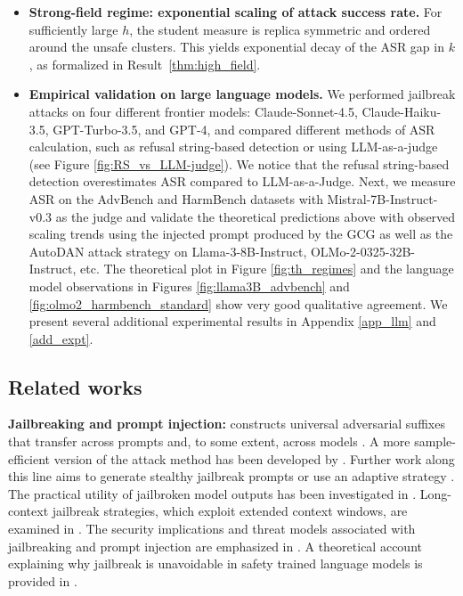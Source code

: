 \documentclass{article}
\theoremstyle{remark} %
\begin{document}
\begin{itemize}
\item \textbf{Strong-field regime: exponential scaling of attack success rate.}
For sufficiently large $h$, the student measure is replica symmetric and ordered around the unsafe clusters. This yields exponential decay of the ASR gap in $k$, as formalized in Result~\ref{thm:high_field}.

\item \textbf{Empirical validation on large language models.} We performed jailbreak attacks on four different frontier models: Claude-Sonnet-4.5, Claude-Haiku-3.5, GPT-Turbo-3.5, and GPT-4, and compared different methods of ASR calculation, such as refusal string-based detection or using LLM-as-a-judge (see Figure \ref{fig:RS_vs_LLM-judge}). We notice that the refusal string-based detection overestimates ASR compared to LLM-as-a-Judge. 
Next, we measure ASR on the AdvBench and HarmBench datasets with Mistral-7B-Instruct-v0.3 as the judge and validate the theoretical predictions above with observed scaling trends using the injected prompt produced by the GCG as well as the AutoDAN attack strategy on Llama-3-8B-Instruct, OLMo-2-0325-32B-Instruct, etc. The theoretical plot in Figure \ref{fig:th_regimes} and the language model observations in Figures \ref{fig:llama3B_advbench} and \ref{fig:olmo2_harmbench_standard}  show very good qualitative agreement. We present several additional experimental results in Appendix \ref{app_llm} and \ref{add_expt}. 
\end{itemize}


 
\subsection{Related works }



\textbf{Jailbreaking and prompt injection:}
\cite{zou2023universal} constructs universal adversarial suffixes that transfer across prompts and, to some extent, across models \citep{chao2023jailbreaking}. A more sample-efficient version of the attack method has been developed by \cite{geisler2024attacking}. Further work along this line aims to generate stealthy jailbreak prompts  \citep{liu2024autodan} or use an adaptive strategy \citep{andriushchenko2024jailbreaking}. The practical utility of jailbroken model outputs has been investigated in \citep{NEURIPS2024_e2e06adf, nikolic2025the}. Long-context jailbreak strategies, which exploit extended context windows, are examined in \citep{anil2024manyshot}. The security implications and threat models associated with jailbreaking and prompt injection are emphasized in \citep{liu2024formalizing, greshake2023not, liu2023prompt}. A  theoretical account explaining why jailbreak is unavoidable in safety trained language models is provided in \cite{su2024mission}.
\end{document}
